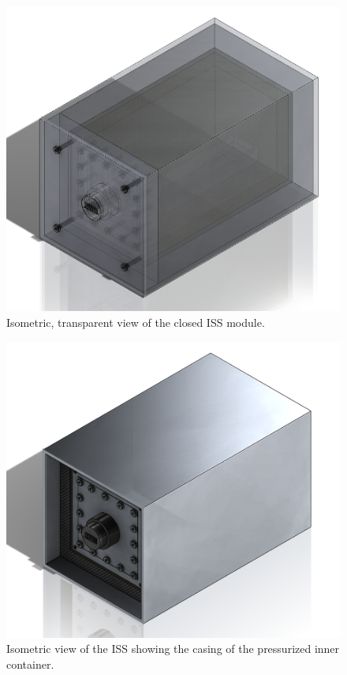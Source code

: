 \begin{centering}
\begin{figure}[H]
    \includegraphics[width=\textwidth]{Figures/iss-closed-transparent.png}
    \caption{Isometric, transparent view of the closed ISS module.}
    \label{fig:iss-closed-transparent-image}
  \end{figure}
  \begin{figure}[H]
    \includegraphics[width=\textwidth]{Figures/iss.png}
    \caption{Isometric view of the ISS showing the casing of the pressurized inner container.}

\end{figure}
\end{centering}
